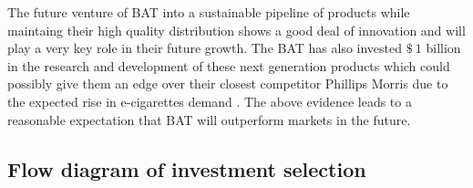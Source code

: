 \documentclass[letterpaper, 10 pt, conference]{ieeeconf}  %
\begin{document}
\noindent The future venture of BAT into a sustainable pipeline of products while maintaing their high quality distribution shows a good deal of innovation and will play a very key role in their future growth. The BAT has also invested $\$~1$ billion in the research and development of these next generation products which could possibly give them an edge over their closest competitor Phillips Morris due to the expected rise in e-cigarettes demand \cite{BAT_comp}\cite{BAT_nextgen}. The above evidence leads to a reasonable expectation that BAT will outperform markets in the future.




\cleardoublepage
\appendix

\subsection{Flow diagram of investment selection}
\end{document}
